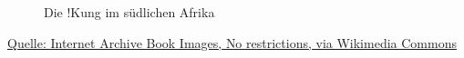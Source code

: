 \documentclass[
  a4paper,
  DIV=11]{scrreprt}
\theoremstyle{definition}
\theoremstyle{remark}
\begin{document}
\begin{figure}

\begin{minipage}[t]{0.50\linewidth}

{\centering 


}

\end{minipage}%
%
\begin{minipage}[t]{0.50\linewidth}

{\centering 


}

\end{minipage}%

\caption{\label{fig-kungs}Die !Kung im südlichen Afrika}

\end{figure}

\href{https://upload.wikimedia.org/wikipedia/commons/b/b5/Wandering_hunters_\%28Masarwa_bushmen\%29\%2C_North_Kalahari_Desert.jpg}{Quelle:
Internet Archive Book Images, No restrictions, via Wikimedia Commons}
\end{document}
